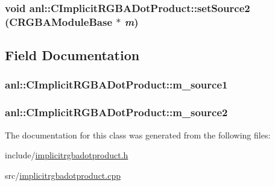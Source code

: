 \label{classanl_1_1CImplicitRGBADotProduct_ac216b0c7ee189e09445c598e618f1857}
\hypertarget{classanl_1_1CImplicitRGBADotProduct_a3b95450f5a58acd5842278ae7a9068ce}{
\subsubsection[{setSource2}]{\setlength{\rightskip}{0pt plus 5cm}void anl::CImplicitRGBADotProduct::setSource2 ({\bf CRGBAModuleBase} $\ast$ {\em m})}}
\label{classanl_1_1CImplicitRGBADotProduct_a3b95450f5a58acd5842278ae7a9068ce}


\subsection{Field Documentation}
\hypertarget{classanl_1_1CImplicitRGBADotProduct_a5315a1397eac353a716f9065a04cb45e}{
\subsubsection[{m\_\-source1}]{ {\bf anl::CImplicitRGBADotProduct::m\_\-source1}}}
\label{classanl_1_1CImplicitRGBADotProduct_a5315a1397eac353a716f9065a04cb45e}
\hypertarget{classanl_1_1CImplicitRGBADotProduct_aeb3cfbc609a5b41160e8905b78ae8557}{
\subsubsection[{m\_\-source2}]{ {\bf anl::CImplicitRGBADotProduct::m\_\-source2}}}
\label{classanl_1_1CImplicitRGBADotProduct_aeb3cfbc609a5b41160e8905b78ae8557}


The documentation for this class was generated from the following files:\begin{DoxyCompactItemize}
\item 
include/\hyperlink{implicitrgbadotproduct_8h}{implicitrgbadotproduct.h}\item 
src/\hyperlink{implicitrgbadotproduct_8cpp}{implicitrgbadotproduct.cpp}\end{DoxyCompactItemize}
